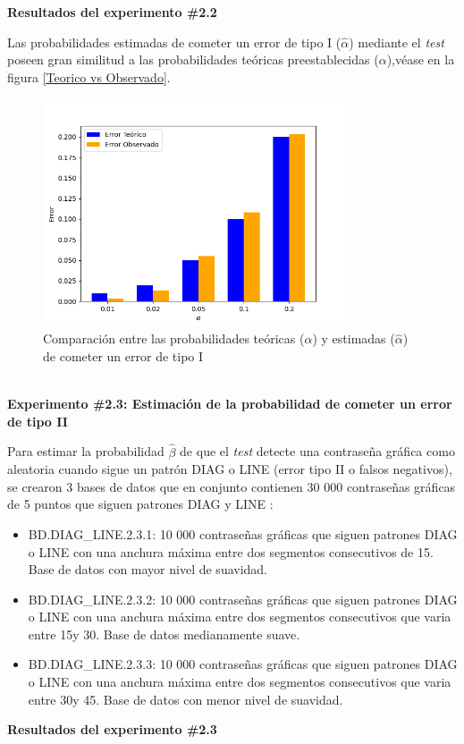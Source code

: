 \documentclass[12pt]{report}
\begin{document}
\textbf{Resultados del experimento \#2.2}

Las probabilidades estimadas de cometer un error de tipo I ($\hat{\alpha}$) mediante el \textit{test} poseen gran similitud  a las probabilidades teóricas preestablecidas ($\alpha$),véase en la figura \ref{Teorico vs Observado}.
\begin{figure}[ht]
	\centering
	
	\includegraphics[width=0.8\textwidth]{4td_teo_obs.png}
	\caption{Comparación entre las probabilidades teóricas ($\alpha$) y estimadas ($\hat{\alpha}$) de cometer un error de tipo I }
	\label{Teorico vs Observado1}
\end{figure}\\

\textbf{Experimento \#2.3: Estimación de la probabilidad de cometer un error de tipo II}

Para estimar la probabilidad $\hat{\beta}$ de que el \textit{test} detecte una contraseña gráfica como aleatoria cuando sigue un patrón DIAG o LINE (error tipo II o falsos negativos), se crearon 3 bases de datos que en conjunto contienen 30 000 contraseñas gráficas de 5 puntos que siguen patrones DIAG y LINE :
\begin{itemize}
	\item BD.DIAG\_LINE.2.3.1: 10 000 contraseñas gráficas que siguen patrones DIAG o LINE con una anchura máxima entre dos segmentos consecutivos de 15\degree. Base de datos con mayor nivel de suavidad. 
	\item BD.DIAG\_LINE.2.3.2: 10 000 contraseñas gráficas que siguen patrones DIAG o LINE con una anchura máxima entre dos segmentos consecutivos que varia entre 15\degree y 30\degree. Base de datos medianamente suave. 
	\item BD.DIAG\_LINE.2.3.3: 10 000 contraseñas gráficas que siguen patrones DIAG o LINE con una anchura máxima entre dos segmentos consecutivos que varia entre 30\degree y 45\degree. Base de datos con menor nivel de suavidad.
\end{itemize}
\textbf{Resultados del experimento \#2.3}
\end{document}
